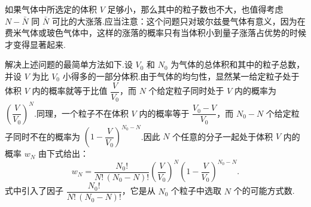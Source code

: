 如果气体中所选定的体积 $V$ 足够小，那么其中的粒子数也不大，也值得考虑 $N-\bar{N}$ 同
$\bar{N}$ 可比的大涨落.应当注意：这个问题只对玻尔兹曼气体有意义，因为在费米气体或玻色气体中，这样的涨落的概率只有当体积小到量子涨落占优势的时候才变得显著起来.

解决上述问题的最简单方法如下.设 $V_{0}$ 和 $N_{0}$ 为气体的总体积和其中的粒子总数，并设
$V$ 为比 $V_{0}$ 小得多的一部分体积.由于气体的均匀性，显然某一给定粒子处于体积 $V$ 内的概率就等于比值 $\dfrac{V}{V_{0}}$，而 $N$ 个给定粒子同时处于 $V$ 内的概率为
$\left(\dfrac{V}{V_{0}}\right)^{N}$.同理，一个粒子不在体积 $V$ 内的概率等于
$\dfrac{V_{0}-V}{V_{0}}$，而 $N_{0}-N$ 个给定粒子同时不在的概率为
$\left(1-\dfrac{V}{V_{0}}\right)^{N_{0}-N}$.因此 $N$ 个任意的分子一起处于体积 $V$ 内的概率 $w_{N}$ 由下式给出：
\begin{equation}
  w_{N}=\frac{N_{0}!}{N!\,(N_{0}-N)!}
  \left(\frac{V}{V_{0}}\right)^{N}
  \left(1-\frac{V}{V_{0}}\right)^{N_{0}-N}.
\end{equation}
式中引入了因子 $\dfrac{N_{0}!}{N!\,(N_{0}-N)!}$，它是从 $N_{0}$ 个粒子中选取 $N$ 个的可能方式数.

